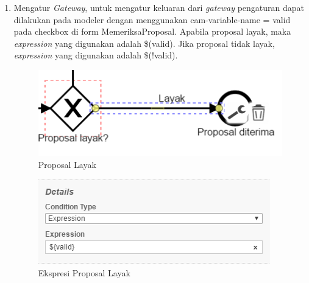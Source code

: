 \begin{enumerate}
\item Mengatur \textit{Gateway}, untuk mengatur keluaran dari \textit{gateway} pengaturan dapat dilakukan pada modeler dengan menggunakan cam-variable-name = valid pada checkbox di form MemeriksaProposal. Apabila proposal layak, maka \textit{expression} yang digunakan adalah \$(valid). Jika proposal tidak layak, \textit{expression} yang digunakan adalah \$(!valid).
		\begin{figure}[H]
			\centering
			\includegraphics[scale=1]{Gambar/Bab-3/Kasus1/5layakgambar}
			\caption{Proposal Layak} 
			\label{fig:pengajuanproposal_layakgambar}
	\end{figure}
	\begin{figure}[H]
			\centering
			\includegraphics[scale=1]{Gambar/Bab-3/Kasus1/6layakkode}
			\caption{Ekspresi Proposal Layak} 
			\label{fig:pengajuanproposal_layakkode}
	\end{figure}
	

\end{enumerate}
